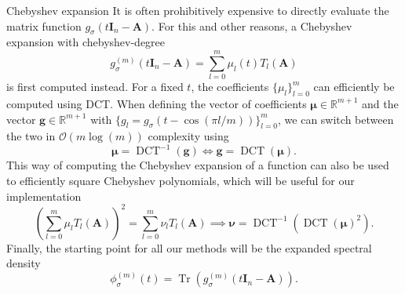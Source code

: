\documentclass[final, 12pt]{beamer}
\newcommand{\mtx}[1]{\boldsymbol{#1}}
\newcommand{\vct}[1]{\boldsymbol{#1}}
\DeclareMathOperator{\Tr}{Tr}
\DeclareMathOperator{\DCT}{DCT}
\begin{document}
\begin{frame}[t]
\begin{columns}[t]
\begin{column}{0.45\paperwidth}
        \begin{block}{Chebyshev expansion}
            It is often prohibitively expensive to directly
            evaluate the matrix function $g_{\sigma}(t\mtx{I}_n - \mtx{A})$.
            For this and other reasons, a Chebyshev expansion with \gls{chebyshev-degree}
            \begin{equation}
                g_{\sigma}^{(m)}(t \mtx{I}_n - \mtx{A}) = \sum_{l=0}^{m} \mu_l(t) T_l(\mtx{A})
            \end{equation}
            is first computed instead. For a fixed $t$, the coefficients $\{\mu_l\}_{l=0}^m$ can
            efficiently be computed using \gls{DCT}.
            When defining the vector of coefficients $\vct{\mu} \in \mathbb{R}^{m+1}$
            and the vector $\vct{g} \in \mathbb{R}^{m+1}$
            with $\{g_l = g_{\sigma}(t - \cos(\pi l / m))\}_{l=0}^m$, we can
            switch between the two in $\mathcal{O}(m \log(m))$ complexity using
            \begin{equation}
                \vct{\mu} = \DCT^{-1}(\vct{g}) \iff \vct{g} = \DCT(\vct{\mu}).
                \label{equ:DCT}
            \end{equation}
            This way of computing the Chebyshev expansion of a function
            can also be used to efficiently square Chebyshev polynomials,
            which will be useful for our implementation
            \begin{equation}
                (\sum_{l=0}^{m} \mu_l T_l(\mtx{A}))^2 = \sum_{l=0}^{m} \nu_l T_l(\mtx{A}) \implies \vct{\nu} = \DCT^{-1}(\DCT(\vct{\mu})^2).
                \label{equ:DCT-squaring}
            \end{equation}
            Finally, the starting point for all our methods will be the expanded spectral density
            \begin{equation}
                \phi_{\sigma}^{(m)}(t) = \Tr(g_{\sigma}^{(m)}(t \mtx{I}_n - \mtx{A})).
                \label{equ:expanded-spectral-density}
            \end{equation}
        \end{block}

    \end{column}
\end{columns}


\end{frame}
\end{document}
